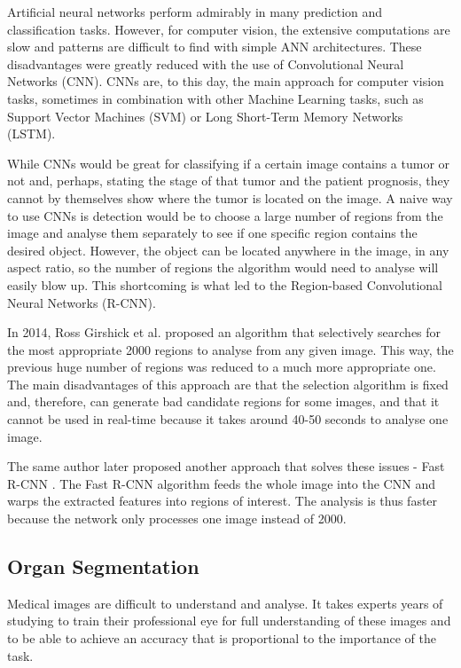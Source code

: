 \documentclass[runningheads,a4paper,11pt]{report}
\begin{document}
Artificial neural networks perform admirably in many prediction and classification tasks. However, for computer vision, the extensive computations are slow and patterns are difficult to find with simple ANN architectures. These disadvantages were greatly reduced with the use of Convolutional Neural Networks (CNN). CNNs are, to this day, the main approach for computer vision tasks, sometimes in combination with other Machine Learning tasks, such as Support Vector Machines (SVM) or Long Short-Term Memory Networks (LSTM).

While CNNs would be great for classifying if a certain image contains a tumor or not and, perhaps, stating the stage of that tumor and the patient prognosis, they cannot by themselves show where the tumor is located on the image. A naive way to use CNNs is detection would be to choose a large number of regions from the image and analyse them separately to see if one specific region contains the desired object. However, the object can be located anywhere in the image, in any aspect ratio, so the number of regions the algorithm would need to analyse will easily blow up. This shortcoming is what led to the Region-based Convolutional Neural Networks (R-CNN).

In 2014, Ross Girshick et al. \cite{girshick2014rich} proposed an algorithm that selectively searches for the most appropriate 2000 regions to analyse from any given image. This way, the previous huge number of regions was reduced to a much more appropriate one. The main disadvantages of this approach are that the selection algorithm is fixed and, therefore, can generate bad candidate regions for some images, and that it cannot be used in real-time because it takes around 40-50 seconds to analyse one image. 

The same author later proposed another approach that solves these issues - Fast R-CNN \cite{girshick2015fast}. The Fast R-CNN algorithm feeds the whole image into the CNN and warps the extracted features into regions of interest. The analysis is thus faster because the network only processes one image instead of 2000.

\subsection{Organ Segmentation}

Medical images are difficult to understand and analyse. It takes experts years of studying to train their professional eye for full understanding of these images and to be able to achieve an accuracy that is proportional to the importance of the task.
\end{document}
